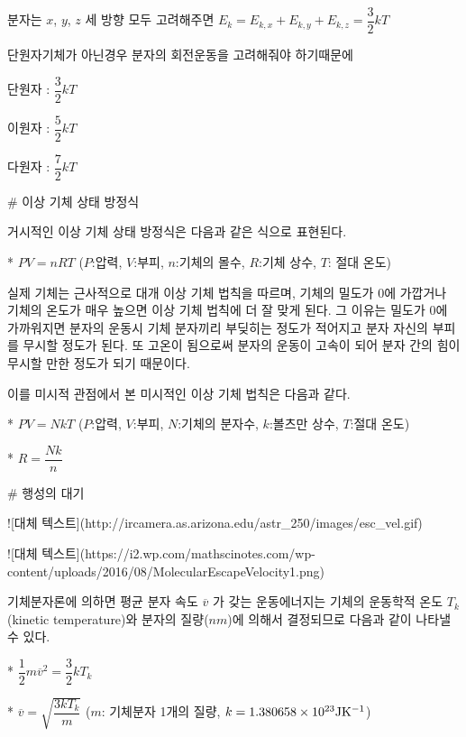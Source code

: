 분자는 $x$, $y$, $z$ 세 방향 모두 고려해주면
$E_{k} = E_{k, x} + E_{k, y} + E_{k, z} = \dfrac{3}{2} kT$

단원자기체가 아닌경우 분자의 회전운동을 고려해줘야 하기때문에

단원자 : $\dfrac{3}{2} kT$

이원자 : $\dfrac{5}{2} kT$

다원자 : $\dfrac{7}{2} kT$



# 이상 기체 상태 방정식

거시적인 이상 기체 상태 방정식은 다음과 같은 식으로 표현된다. 

*  $ PV = nRT $
($P$:압력, $V$:부피, $n$:기체의 몰수, $R$:기체 상수, $T$: 절대 온도)

실제 기체는 근사적으로 대개 이상 기체 법칙을 따르며, 기체의 밀도가 0에 가깝거나 기체의 온도가 매우 높으면 이상 기체 법칙에 더 잘 맞게 된다. 그 이유는 밀도가 0에 가까워지면 분자의 운동시 기체 분자끼리 부딪히는 정도가 적어지고 분자 자신의 부피를 무시할 정도가 된다. 또 고온이 됨으로써 분자의 운동이 고속이 되어 분자 간의 힘이 무시할 만한 정도가 되기 때문이다.

이를 미시적 관점에서 본 미시적인 이상 기체 법칙은 다음과 같다.

*  $ PV = N k T $
($P$:압력, $V$:부피, $N$:기체의 분자수, $k$:볼츠만 상수, $T$:절대 온도)

*  $ R = \dfrac{Nk}{n} $



# 행성의 대기


![대체 텍스트](http://ircamera.as.arizona.edu/astr_250/images/esc_vel.gif)

![대체 텍스트](https://i2.wp.com/mathscinotes.com/wp-content/uploads/2016/08/MolecularEscapeVelocity1.png)

기체분자론에 의하면 평균 분자 속도 ${\overline{v}}$ 가 갖는 운동에너지는 기체의 운동학적 온도 $T_{k}$ (kinetic temperature)와 분자의 질량($nm$)에 의해서 결정되므로 다음과 같이 나타낼 수 있다.

*  $ \dfrac{1}{2} m {\overline{v}}^{2} = \dfrac{3}{2} k T_{k}$

*  $ \overline{v} = \sqrt {\dfrac{3kT_{k}}{m}} $
($m$: 기체분자 1개의 질량, $k = 1.380658 \times 10^{23}\rm{J K^{-1}}$) 









